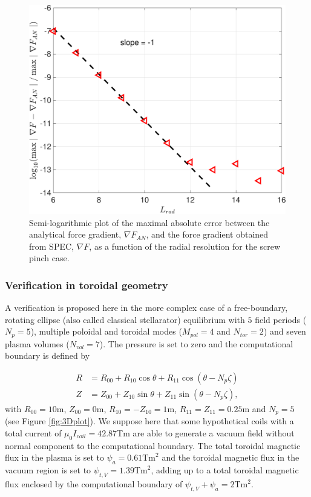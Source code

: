 \documentclass[my_thesis.tex]{subfiles}
\begin{document}
\begin{figure}
	\centering
	\includegraphics[width=0.5\linewidth]{main/Figures_CurrentConstraint/ABaillod_fig7.pdf}
	\caption{Semi-logarithmic plot of the maximal absolute error between the analytical force gradient, $\nabla F_{AN}$, and the force gradient obtained from \ac{SPEC}, $\nabla F$, as a function of the radial resolution for the screw pinch case.}
	\label{fig:ForceGradient_Convergence_ScrewPinch}
\end{figure}

\subsubsection{Verification in toroidal geometry}

A verification is proposed here in the more complex case of a free-boundary, rotating ellipse (also called classical stellarator) equilibrium with $5$ field periods ($N_p=5$), multiple poloidal and toroidal modes ($M_{pol}=4$ and $N_{tor}=2$) and seven plasma volumes ($N_{vol}=7$). The pressure is set to zero and the computational boundary is defined by

\begin{align}
	R &= R_{00} + R_{10} \cos\theta + R_{11}\cos(\theta - N_p\zeta)\label{eq.RotEllipse_R}\\
	Z &= Z_{00} + Z_{10} \sin\theta + Z_{11}\sin(\theta - N_p\zeta),\label{eq.RotEllipse_Z}
\end{align}
with $R_{00}=10$m, $Z_{00}=0$m, $R_{10}=-Z_{10}=1$m, $R_{11}=Z_{11}=0.25$m and $N_p = 5$ (see Figure \ref{fig:3Dplot}). We suppose here that some hypothetical coils with a total current of $\mu_0I_{coil}=42.87$Tm are able to generate a vacuum field without normal component to the computational boundary. The total toroidal magnetic flux in the plasma is set to $\psi_a=0.61\text{Tm}^2$ and the toroidal magnetic flux in the vacuum region is set to $\psi_{t,V}=1.39\text{Tm}^2$, adding up to a total toroidal magnetic flux enclosed by the computational boundary of $\psi_{t,V} + \psi_a = 2\text{Tm}^2$.
\end{document}
